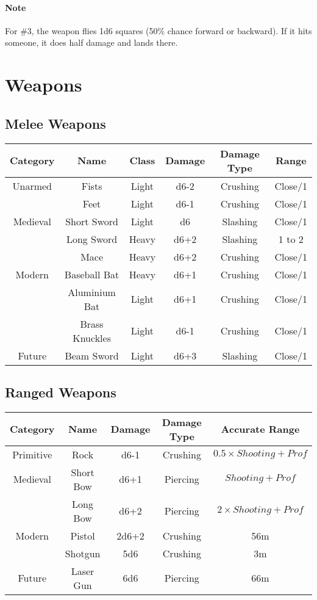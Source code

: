 \paragraph{Note}For \#3, the weapon flies 1d6 squares (50\% chance forward or backward). If it hits someone, it does half damage and lands there.

\section{Weapons} \label{sec:weapons}
\subsection{Melee Weapons}
\begin{center}
\begin{tabular}{c|c|c|c|c|c}
    \textbf{Category} & \textbf{Name} & \textbf{Class} & \textbf{Damage} & \textbf{Damage Type} & \textbf{Range} \\\hline
    Unarmed  & Fists          & Light & d6-2 & Crushing & Close/1\\
             & Feet           & Light & d6-1 & Crushing & Close/1\\\hline
    Medieval & Short Sword    & Light & d6   & Slashing & Close/1\\
             & Long Sword     & Heavy & d6+2 & Slashing & 1 to 2 \\
             & Mace           & Heavy & d6+2 & Crushing & Close/1\\\hline
    Modern   & Baseball Bat   & Heavy & d6+1 & Crushing & Close/1\\
             & Aluminium Bat  & Light & d6+1 & Crushing & Close/1\\
             & Brass Knuckles & Light & d6-1 & Crushing & Close/1\\\hline
    Future   & Beam Sword     & Light & d6+3 & Slashing & Close/1
\end{tabular}
\end{center}

\subsection{Ranged Weapons}
\begin{center}
\begin{tabular}{c|c|c|c|c}
    \textbf{Category} & \textbf{Name} & \textbf{Damage} & \textbf{Damage Type} & \textbf{Accurate Range} \\\hline
    Primitive & Rock        & d6-1  & Crushing & $0.5 \times Shooting + Prof$  \\\hline
    Medieval  & Short Bow   & d6+1  & Piercing & $Shooting + Prof$ \\
              & Long Bow    & d6+2  & Piercing & $2 \times Shooting + Prof$ \\\hline
    Modern    & Pistol      & 2d6+2 & Crushing & 56m \\
              & Shotgun     & 5d6   & Crushing & 3m \\\hline
    Future    & Laser Gun   & 6d6   & Piercing & 66m \\
\end{tabular}
\end{center}
